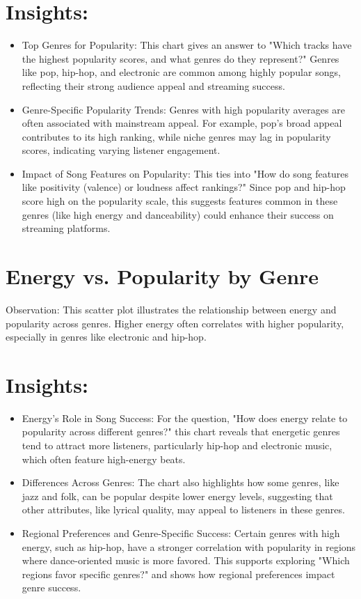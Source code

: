 \documentclass[12pt]{article}
\begin{document}
\section*{Insights:}
\begin{itemize}
  \item Top Genres for Popularity: This chart gives an answer to "Which tracks have the highest popularity scores, and what genres do they represent?" Genres like pop, hip-hop, and electronic are common among highly popular songs, reflecting their strong audience appeal and streaming success.
  \item Genre-Specific Popularity Trends: Genres with high popularity averages are often associated with mainstream appeal. For example, pop's broad appeal contributes to its high ranking, while niche genres may lag in popularity scores, indicating varying listener engagement.
  \item Impact of Song Features on Popularity: This ties into "How do song features like positivity (valence) or loudness affect rankings?" Since pop and hip-hop score high on the popularity scale, this suggests features common in these genres (like high energy and danceability) could enhance their success on streaming platforms.
\end{itemize}

\section*{Energy vs. Popularity by Genre}

Observation: This scatter plot illustrates the relationship between energy and popularity across genres. Higher energy often correlates with higher popularity, especially in genres like electronic and hip-hop.

\section*{Insights:}
\begin{itemize}
  \item Energy's Role in Song Success: For the question, "How does energy relate to popularity across different genres?" this chart reveals that energetic genres tend to attract more listeners, particularly hip-hop and electronic music, which often feature high-energy beats.
  \item Differences Across Genres: The chart also highlights how some genres, like jazz and folk, can be popular despite lower energy levels, suggesting that other attributes, like lyrical quality, may appeal to listeners in these genres.
  \item Regional Preferences and Genre-Specific Success: Certain genres with high energy, such as hip-hop, have a stronger correlation with popularity in regions where dance-oriented music is more favored. This supports exploring "Which regions favor specific genres?" and shows how regional preferences impact genre success.
\end{itemize}
\end{document}

